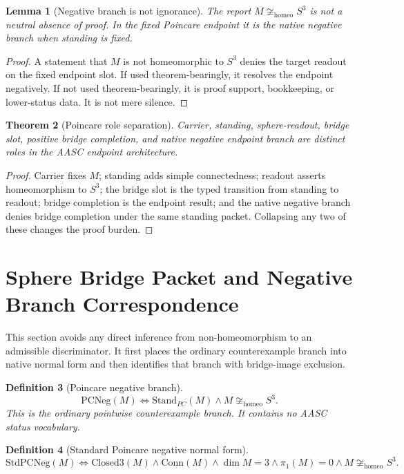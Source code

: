 \documentclass[11pt]{article}
\newtheorem{theorem}{Theorem}[section]
\newtheorem{lemma}[theorem]{Lemma}
\newtheorem{definition}[theorem]{Definition}
\newcommand{\Sthree}{S^{3}}
\newcommand{\ClosedThree}{\mathrm{Closed3}}
\newcommand{\Conn}{\mathrm{Conn}}
\newcommand{\StandPC}{\mathrm{Stand}_{PC}}
\newcommand{\PCNeg}{\mathrm{PCNeg}}
\newcommand{\StdPCNeg}{\mathrm{StdPCNeg}}
\newcommand{\Homeo}{\cong_{\mathrm{homeo}}}
\begin{document}
\begin{lemma}[Negative branch is not ignorance]
The report \(M\not\Homeo\Sthree\) is not a neutral absence of proof. In the fixed Poincare endpoint it is the native negative branch when standing is fixed.
\end{lemma}
\begin{proof}
A statement that \(M\) is not homeomorphic to \(\Sthree\) denies the target readout on the fixed endpoint slot. If used theorem-bearingly, it resolves the endpoint negatively. If not used theorem-bearingly, it is proof support, bookkeeping, or lower-status data. It is not mere silence.
\end{proof}

\begin{theorem}[Poincare role separation]
Carrier, standing, sphere-readout, bridge slot, positive bridge completion, and native negative endpoint branch are distinct roles in the AASC endpoint architecture.
\end{theorem}
\begin{proof}
Carrier fixes \(M\); standing adds simple connectedness; readout asserts homeomorphism to \(\Sthree\); the bridge slot is the typed transition from standing to readout; bridge completion is the endpoint result; and the native negative branch denies bridge completion under the same standing packet. Collapsing any two of these changes the proof burden.
\end{proof}

\section{Sphere Bridge Packet and Negative Branch Correspondence}\label{sec:negative-correspondence}

This section avoids any direct inference from non-homeomorphism to an admissible discriminator. It first places the ordinary counterexample branch into native normal form and then identifies that branch with bridge-image exclusion.

\begin{definition}[Poincare negative branch]
\[
\PCNeg(M)\Longleftrightarrow \StandPC(M)\wedge M\not\Homeo\Sthree.
\]
This is the ordinary pointwise counterexample branch. It contains no AASC status vocabulary.
\end{definition}

\begin{definition}[Standard Poincare negative normal form]
\[
\StdPCNeg(M)\Longleftrightarrow \ClosedThree(M)\wedge\Conn(M)\wedge\dim M=3\wedge\pi_1(M)=0\wedge M\not\Homeo\Sthree.
\]
\end{definition}
\end{document}
